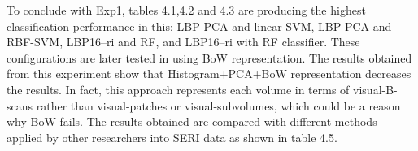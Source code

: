 To conclude with Exp1, tables 4.1,4.2 and 4.3 are producing the highest classification performance in this: LBP-PCA and linear-SVM, LBP-PCA and RBF-SVM, LBP16–ri and RF, and LBP16–ri with RF classifier.
These configurations are later tested in  using BoW representation. The results obtained from this experiment show that Histogram+PCA+BoW representation decreases the results.
In fact, this approach represents each volume in terms of visual-B-scans rather than visual-patches or visual-subvolumes, which could be a reason why BoW fails.
The results obtained are compared with different methods applied by other researchers into SERI data as shown in table 4.5\cite{JoanMassich2016}.
\begin{table*}
\caption{Summary of the classification performance in terms of se and sp in(\%)}
\centering
{}
\end{table*}

